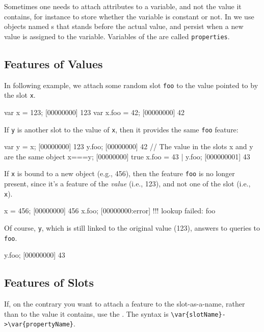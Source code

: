 Sometimes one needs to attach attributes to a variable, and not the value
it contains, for instance to store whether the variable is constant or not.
In \us we use objects named s that stands before the actual
value, and persist when a new value is assigned to the variable. Variables of
the  are called \lstinline{properties}.

\subsection{Features of Values}
In following example, we attach some random slot \lstinline|foo| to the
value pointed to by the slot \lstinline|x|.

\begin{urbiscript}
var x = 123;
[00000000] 123
var x.foo = 42;
[00000000] 42
\end{urbiscript}

If \lstinline|y| is another slot to the value of \lstinline|x|, then it
provides the same \lstinline|foo| feature:

\begin{urbiscript}
var y = x;
[00000000] 123
y.foo;
[00000000] 42
// The value in the slots x and y are the same object
x===y;
[00000000] true
x.foo = 43 | y.foo;
[000000001] 43
\end{urbiscript}

If \lstinline|x| is bound to a new object (e.g., 456), then the feature
\lstinline|foo| is no longer present, since it's a feature of the
\emph{value} (i.e., 123), and not one of the slot (i.e., \lstinline|x|).

\begin{urbiscript}
x = 456;
[00000000] 456
x.foo;
[00000000:error] !!! lookup failed: foo
\end{urbiscript}

Of course, \lstinline|y|, which is still linked to the original value (123),
answers to queries to \lstinline|foo|.

\begin{urbiscript}
y.foo;
[00000000] 43
\end{urbiscript}

\subsection{Features of Slots}

If, on the contrary you want to attach a feature to the slot-as-a-name,
rather than to the value it contains, use the .  The syntax
is \lstinline|\var{slotName}->\var{propertyName}|.

